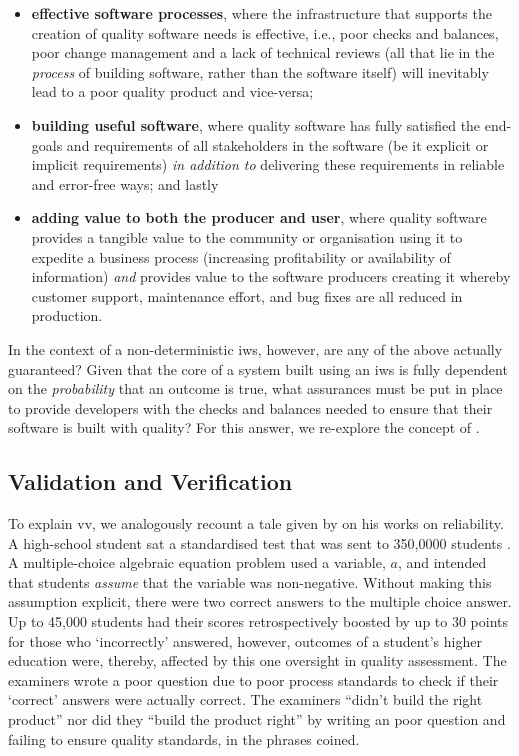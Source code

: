 \begin{itemize}
  \item \textbf{effective software processes}, where the infrastructure that supports the creation of quality software needs is effective, i.e., poor checks and balances, poor change management and a lack of technical reviews (all that lie in the \textit{process} of building software, rather than the software itself) will inevitably lead to a poor quality product and vice-versa;
  \item \textbf{building useful software}, where quality software has fully satisfied the end-goals and requirements of all stakeholders in the software (be it explicit or implicit requirements) \textit{in addition to} delivering these requirements in reliable and error-free ways; and lastly
  \item \textbf{adding value to both the producer and user}, where quality software provides a tangible value to the community or organisation using it to expedite a business process (increasing profitability or availability of information) \textit{and} provides value to the software producers creating it whereby  customer support, maintenance effort, and bug fixes are all reduced in production.
\end{itemize}

In the context of a non-deterministic \gls{iws}, however, are any of the above actually guaranteed? Given that the core of a system built using an \gls{iws} is fully dependent on the \textit{probability} that an outcome is true, what assurances must be put in place to provide developers with the checks and balances needed to ensure that their software is built with quality? For this answer, we re-explore the concept of .

\subsection{Validation and Verification}
\label{ssec:background:software-quality:v-and-v}

To explain \gls{vv}, we analogously recount a tale given by \citet{Pham:2000ua} on his works on reliability. A high-school student sat a standardised test that was sent to 350,0000 students \citep{Tabor:1997tw}. A multiple-choice algebraic equation problem used a variable, $a$, and intended that students \textit{assume} that the variable was non-negative. Without making this assumption explicit, there were two correct answers to the multiple choice answer. Up to 45,000 students had their scores retrospectively boosted by up to 30 points for those who `incorrectly' answered, however, outcomes of a student's higher education were, thereby, affected by this one oversight in quality assessment. The examiners wrote a poor question due to poor process standards to check if their `correct' answers were actually correct. The examiners ``didn't build the right product'' nor did they ``build the product right'' by writing an poor question and failing to ensure quality standards, in the phrases \citet{Boehm:1981ua} coined.

